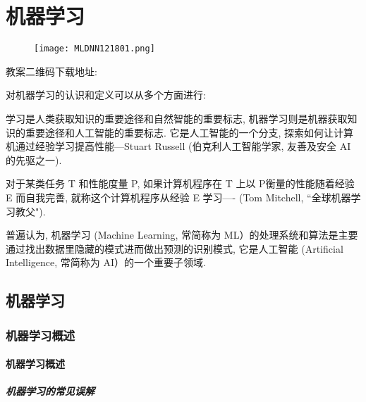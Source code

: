 \chapter{机器学习}\label{AI32PChapter7}
\begin{figure}[H]
\centering
\texttt{[image: MLDNN121801.png]}
\label{MLDNN12019121501}
\end{figure}
教案二维码下载地址: 

对机器学习的认识和定义可以从多个方面进行:
\begin{tcolorbox}[colback=white!50,colframe=orange!50,title=机器学习]
学习是人类获取知识的重要途径和自然智能的重要标志, 机器学习则是机器获取知识的重要途径和人工智能的重要标志.
它是人工智能的一个分支, 探索如何让计算机通过经验学习提高性能---Stuart Russell (伯克利人工智能学家, 友善及安全 AI 的先驱之一).
\end{tcolorbox}
\begin{tcolorbox}[colback=white!50,colframe=orange!50,title=机器学习]
对于某类任务 T 和性能度量 P, 如果计算机程序在 T 上以 P衡量的性能随着经验 E 而自我完善, 就称这个计算机程序从经验 E 学习---- (Tom Mitchell, “全球机器学习教父").
\hfill
\end{tcolorbox}
普遍认为, 机器学习 (Machine Learning, 常简称为 ML）的处理系统和算法是主要通过找出数据里隐藏的模式进而做出预测的识别模式, 它是人工智能 (Artificial Intelligence, 常简称为 AI）的一个重要子领域.
\section{机器学习}
\subsection{机器学习概述}
\subsubsection{机器学习概述}
\paragraph{机器学习的常见误解}

